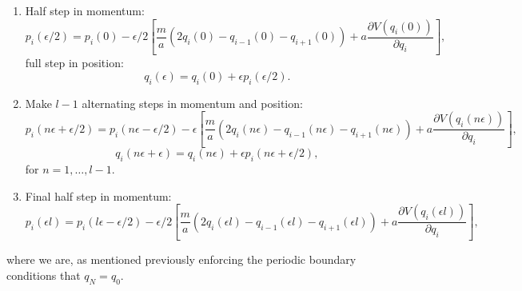 \documentclass[12pt]{article}
\begin{document}
            \begin{enumerate}
                \item Half step in momentum:
                \begin{equation}
                    \label{eq:MomentumInitialHalfStepQuadraticQHO}
                    p_i\left(\epsilon/2\right) = p_i\left(0\right) - \epsilon/2\left[\frac{m}{a}\left(2q_i\left(0\right)-q_{i-1}\left(0\right)-q_{i+1}\left(0\right)\right)+a\frac{\partial V\left(q_i\left(0\right)\right)}{\partial q_i}\right],
                \end{equation}
                full step in position:
                \begin{equation}
                    \label{eq:PositionInitialStepQuadraticQHO}
                    q_i\left(\epsilon\right) = q_i\left(0\right) + \epsilon p_i\left(\epsilon/2\right).
                \end{equation}
                \item Make $l-1$ alternating steps in momentum and position:
                \begin{equation}
                    \label{eq:MomentumFullStepQuadraticQHO}
                    p_i\left(n\epsilon+\epsilon/2\right) = p_i\left(n\epsilon-\epsilon/2\right) - \epsilon\left[\frac{m}{a}\left(2q_i\left(n\epsilon\right)-q_{i-1}\left(n\epsilon\right)-q_{i+1}\left(n\epsilon\right)\right)+a\frac{\partial V\left(q_i\left(n\epsilon\right)\right)}{\partial q_i}\right],
                \end{equation}
                \begin{equation}
                    \label{eq:PositionFullStepQuadraticQHO}
                    q_i\left(n\epsilon+\epsilon\right) = q_i\left(n\epsilon\right) + \epsilon p_i\left(n\epsilon+\epsilon/2\right),
                \end{equation}
                for $n = 1, \dots , l-1$.
                \item Final half step in momentum:
                \begin{equation}
                    \label{eq:MomnetumQuadraticKinetic}
                    p_i\left(\epsilon l\right) = p_i\left(l\epsilon-\epsilon/2\right) - \epsilon/2\left[\frac{m}{a}\left(2q_i\left(\epsilon l\right)-q_{i-1}\left(\epsilon l\right)-q_{i+1}\left(\epsilon l\right)\right)+a\frac{\partial V\left(q_i\left(\epsilon l\right)\right)}{\partial q_i}\right],
                \end{equation}
            \end{enumerate}
            where we are, as mentioned previously enforcing the periodic boundary conditions that $q_N=q_0$.
\end{document}
